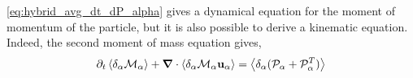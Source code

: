 \ref{eq:hybrid_avg_dt_dP_alpha} gives a dynamical equation for the moment of momentum of the particle, but it is also possible to derive a kinematic equation. 
Indeed, the second moment of mass equation gives, 
\begin{equation}
    \partial_t \left<\delta_\alpha \mathcal{M}_\alpha\right>
    + \bm{\nabla} \cdot \left<\delta_\alpha \mathcal{M}_\alpha \textbf{u}_\alpha\right>
    = \left<\delta_\alpha (\mathcal{P}_\alpha + \mathcal{P}_\alpha^T)\right>
    \label{eq:avg_p_G_alpha}
\end{equation}
